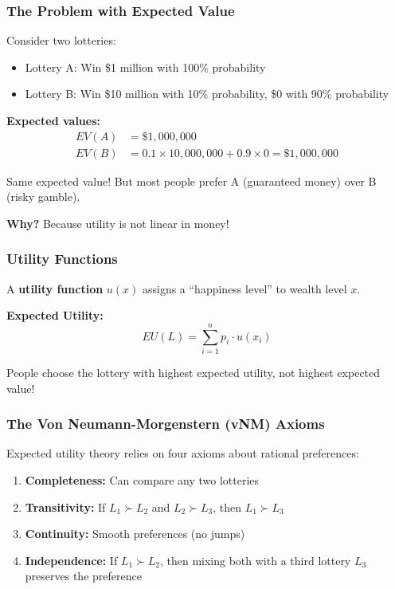 \documentclass[10pt,letterpaper]{article}
\begin{document}
\subsubsection{The Problem with Expected Value}

Consider two lotteries:
\begin{itemize}
  \item Lottery A: Win \$1 million with 100\% probability
  \item Lottery B: Win \$10 million with 10\% probability, \$0 with 90\% probability
\end{itemize}

\textbf{Expected values:}
\begin{align*}
EV(A) &= \$1,000,000 \\
EV(B) &= 0.1 \times 10,000,000 + 0.9 \times 0 = \$1,000,000
\end{align*}

Same expected value! But most people prefer A (guaranteed money) over B (risky gamble).

\textbf{Why?} Because utility is not linear in money!

\subsubsection{Utility Functions}

A \textbf{utility function} $u(x)$ assigns a ``happiness level'' to wealth level $x$.

\begin{formulabox}
\textbf{Expected Utility:}
\[
\boxed{EU(L) = \sum_{i=1}^n p_i \cdot u(x_i)}
\]

People choose the lottery with highest expected utility, not highest expected value!
\end{formulabox}

\subsubsection{The Von Neumann-Morgenstern (vNM) Axioms}

Expected utility theory relies on four axioms about rational preferences:

\begin{enumerate}
  \item \textbf{Completeness:} Can compare any two lotteries
  \item \textbf{Transitivity:} If $L_1 \succ L_2$ and $L_2 \succ L_3$, then $L_1 \succ L_3$
  \item \textbf{Continuity:} Smooth preferences (no jumps)
  \item \textbf{Independence:} If $L_1 \succ L_2$, then mixing both with a third lottery $L_3$ preserves the preference
\end{enumerate}
\end{document}
